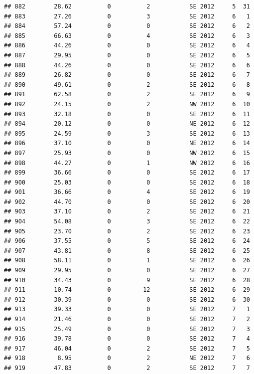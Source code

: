 \documentclass[
]{article}
\begin{document}
\begin{verbatim}
## 882        28.62          0          2           SE 2012     5  31
## 883        27.26          0          3           SE 2012     6   1
## 884        57.24          0          0           SE 2012     6   2
## 885        66.63          0          4           SE 2012     6   3
## 886        44.26          0          0           SE 2012     6   4
## 887        29.95          0          0           SE 2012     6   5
## 888        44.26          0          0           SE 2012     6   6
## 889        26.82          0          0           SE 2012     6   7
## 890        49.61          0          2           SE 2012     6   8
## 891        62.58          0          2           SE 2012     6   9
## 892        24.15          0          2           NW 2012     6  10
## 893        32.18          0          0           SE 2012     6  11
## 894        20.12          0          0           NE 2012     6  12
## 895        24.59          0          3           SE 2012     6  13
## 896        37.10          0          0           NE 2012     6  14
## 897        25.93          0          0           NW 2012     6  15
## 898        44.27          0          1           NW 2012     6  16
## 899        36.66          0          0           SE 2012     6  17
## 900        25.03          0          0           SE 2012     6  18
## 901        36.66          0          4           SE 2012     6  19
## 902        44.70          0          0           SE 2012     6  20
## 903        37.10          0          2           SE 2012     6  21
## 904        54.08          0          3           SE 2012     6  22
## 905        23.70          0          2           SE 2012     6  23
## 906        37.55          0          5           SE 2012     6  24
## 907        43.81          0          8           SE 2012     6  25
## 908        58.11          0          1           SE 2012     6  26
## 909        29.95          0          0           SE 2012     6  27
## 910        34.43          0          9           SE 2012     6  28
## 911        10.74          0         12           SE 2012     6  29
## 912        30.39          0          0           SE 2012     6  30
## 913        39.33          0          0           SE 2012     7   1
## 914        21.46          0          0           SE 2012     7   2
## 915        25.49          0          0           SE 2012     7   3
## 916        39.78          0          0           SE 2012     7   4
## 917        46.04          0          2           SE 2012     7   5
## 918         8.95          0          2           NE 2012     7   6
## 919        47.83          0          2           SE 2012     7   7

\end{verbatim}
\end{document}
